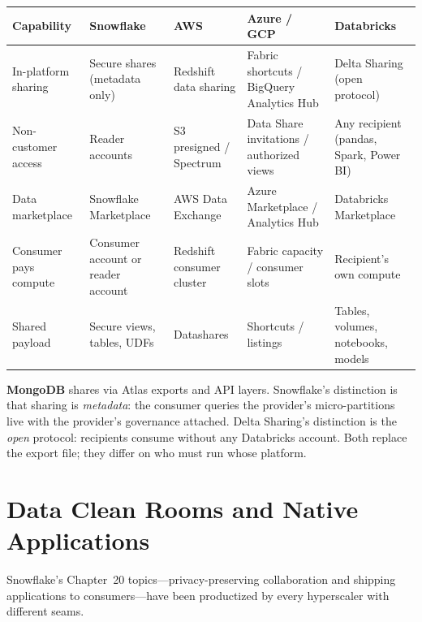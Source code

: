 \begin{center}
\footnotesize
\begin{tabular}{@{}p{2.5cm}p{2.9cm}p{2.7cm}p{2.9cm}p{2.9cm}@{}}
\toprule
\textbf{Capability} & \textbf{Snowflake} & \textbf{AWS} & \textbf{Azure / GCP} & \textbf{Databricks} \\
\midrule
In-platform sharing & Secure shares (metadata only) & Redshift data sharing & Fabric shortcuts / BigQuery Analytics Hub & Delta Sharing (open protocol) \\
Non-customer access & Reader accounts & S3 presigned / Spectrum & Data Share invitations / authorized views & Any recipient (pandas, Spark, Power BI) \\
Data marketplace & Snowflake Marketplace & AWS Data Exchange & Azure Marketplace / Analytics Hub & Databricks Marketplace \\
Consumer pays compute & Consumer account or reader account & Redshift consumer cluster & Fabric capacity / consumer slots & Recipient's own compute \\
Shared payload & Secure views, tables, UDFs & Datashares & Shortcuts / listings & Tables, volumes, notebooks, models \\
\bottomrule
\end{tabular}
\end{center}

\noindent \textbf{MongoDB} shares via Atlas exports and API layers. Snowflake's distinction is
that sharing is \emph{metadata}: the consumer queries the provider's micro-partitions live with
the provider's governance attached. Delta Sharing's distinction is the \emph{open} protocol:
recipients consume without any Databricks account. Both replace the export file; they differ on
who must run whose platform.

\section{Data Clean Rooms and Native Applications}
%
Snowflake's Chapter~20 topics---privacy-preserving collaboration and shipping applications to
consumers---have been productized by every hyperscaler with different seams.


